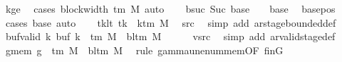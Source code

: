 \begin{isabellebody}
\ kge{}\ \isamarkupfalse%
\ {\isacharparenleft}{\kern0pt}cases\ {\isachardoublequoteopen}block{\isacharunderscore}{\kern0pt}width\ {\isacharparenleft}{\kern0pt}{\isasymGamma}{\isacharunderscore}{\kern0pt}tm\ M{\isacharparenright}{\kern0pt}{\isachardoublequoteclose}{\isacharparenright}{\kern0pt}\ auto\isanewline
\ \ \isamarkupfalse%
\ bsuc{\isacharcolon}{\kern0pt}\ {\isachardoublequoteopen}Suc\ {\isacharparenleft}{\kern0pt}base\ {\isacharminus}{\kern0pt}\ {}{\isacharparenright}{\kern0pt}\ {\isacharequal}{\kern0pt}\ base{\isachardoublequoteclose}\ \isamarkupfalse%
\ base{\isacharunderscore}{\kern0pt}pos\ \isamarkupfalse%
\ {\isacharparenleft}{\kern0pt}cases\ base{\isacharparenright}{\kern0pt}\ auto\isanewline
\ \ \isamarkupfalse%
\ tk{\isacharunderscore}{\kern0pt}lt{\isacharcolon}{\kern0pt}\ {\isachardoublequoteopen}tk\ {\isacharless}{\kern0pt}\ k{\isacharunderscore}{\kern0pt}tm\ M{\isachardoublequoteclose}\ \isamarkupfalse%
\ src{}\ \isamarkupfalse%
\ {\isacharparenleft}{\kern0pt}simp\ add{\isacharcolon}{\kern0pt}\ ar{\isacharunderscore}{\kern0pt}stage{\isacharunderscore}{\kern0pt}bounded{\isacharunderscore}{\kern0pt}def{\isacharparenright}{\kern0pt}\isanewline
\ \ \isamarkupfalse%
\ buf{\isacharunderscore}{\kern0pt}valid{\isacharcolon}{\kern0pt}\ {\isachardoublequoteopen}{\isasymforall}k{\isachardot}{\kern0pt}\ buf\ k\ {\isasymin}\ {\isasymGamma}{\isacharunderscore}{\kern0pt}tm\ M\ {\isasymunion}\ {\isacharbraceleft}{\kern0pt}bl{\isacharunderscore}{\kern0pt}tm\ M{\isacharbraceright}{\kern0pt}{\isachardoublequoteclose}\isanewline
\ \ \ \ \isamarkupfalse%
\ vsrc\ \isamarkupfalse%
\ {\isacharparenleft}{\kern0pt}simp\ add{\isacharcolon}{\kern0pt}\ ar{\isacharunderscore}{\kern0pt}valid{\isacharunderscore}{\kern0pt}stage{\isacharunderscore}{\kern0pt}def{\isacharparenright}{\kern0pt}\isanewline
\ \ \isamarkupfalse%
\ g{}{\isacharunderscore}{\kern0pt}mem{\isacharcolon}{\kern0pt}\ {\isachardoublequoteopen}{\isacharquery}{\kern0pt}g{}\ {\isasymin}\ {\isasymGamma}{\isacharunderscore}{\kern0pt}tm\ M\ {\isasymunion}\ {\isacharbraceleft}{\kern0pt}bl{\isacharunderscore}{\kern0pt}tm\ M{\isacharbraceright}{\kern0pt}{\isachardoublequoteclose}\ \isamarkupfalse%
\ {\isacharparenleft}{\kern0pt}rule\ gamma{\isacharunderscore}{\kern0pt}unenum{\isacharunderscore}{\kern0pt}mem{\isacharbrackleft}{\kern0pt}OF\ finG{\isacharbrackright}{\kern0pt}{\isacharparenright}{\kern0pt}\isanewline

\end{isabellebody}
